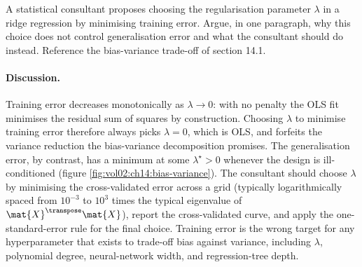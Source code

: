\begin{exercise}
A statistical consultant proposes choosing the regularisation
parameter $\lambda$ in a ridge regression by minimising training
error. Argue, in one paragraph, why this choice does not control
generalisation error and what the consultant should do instead.
Reference the bias-variance trade-off of section 14.1.

\paragraph{Discussion.} Training error decreases monotonically
as $\lambda \to 0$: with no penalty the OLS fit minimises the
residual sum of squares by construction. Choosing $\lambda$ to
minimise training error therefore always picks $\lambda = 0$,
which is OLS, and forfeits the variance reduction the
bias-variance decomposition promises. The generalisation error,
by contrast, has a minimum at some $\lambda^{\star} > 0$
whenever the design is ill-conditioned (figure
\ref{fig:vol02:ch14:bias-variance}). The consultant should
choose $\lambda$ by minimising the cross-validated error across
a grid (typically logarithmically spaced from $10^{-3}$ to
$10^{3}$ times the typical eigenvalue of $\mat{X}^{\transpose}
\mat{X}$), report the cross-validated curve, and apply the
one-standard-error rule for the final choice. Training error is
the wrong target for any hyperparameter that exists to
trade-off bias against variance, including $\lambda$, polynomial
degree, neural-network width, and regression-tree depth.
\end{exercise}

